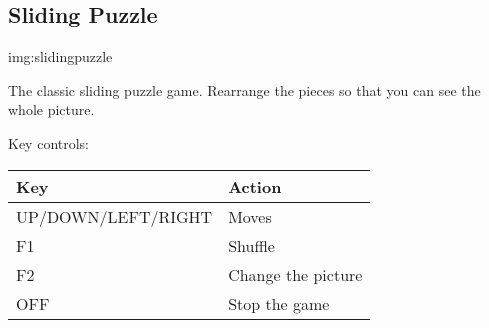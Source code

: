 \subsection{Sliding Puzzle}
%
{img:slidingpuzzle}

The classic sliding puzzle game.  Rearrange the pieces so that you can
see the whole picture.

Key controls:

\begin{table}[h!]
\begin{center}
\begin{tabular}{@{}ll@{}}\toprule
\textbf{Key} & \textbf{Action}\\\midrule
UP/DOWN/LEFT/RIGHT & Moves \\
F1 & Shuffle \\
F2 & Change the picture \\
OFF & Stop the game \\\bottomrule
\end{tabular}
\end{center}
\end{table}
